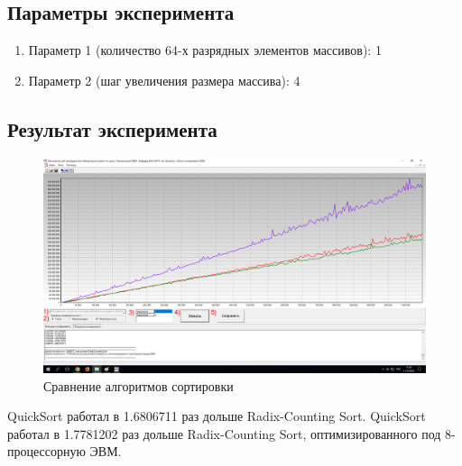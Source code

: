 \documentclass[a4paper,oneside,14pt]{extarticle}
\begin{document}
\subsection{Параметры эксперимента}

\begin{enumerate}
    \item Параметр 1 (количество 64-х разрядных элементов массивов): 1
    \item Параметр 2 (шаг увеличения размера массива): 4
\end{enumerate}

\subsection{Результат эксперимента}

\begin{figure}[H]
	\centering
	\includegraphics[width=1\textwidth]{img/6.png}
    \caption{Сравнение алгоритмов сортировки}
	\label{fig:6}
\end{figure}

QuickSort работал в 1.6806711 раз дольше Radix-Counting Sort.
QuickSort работал в 1.7781202 раз дольше Radix-Counting Sort, оптимизированного под 8-процессорную ЭВМ.



\end{document}
